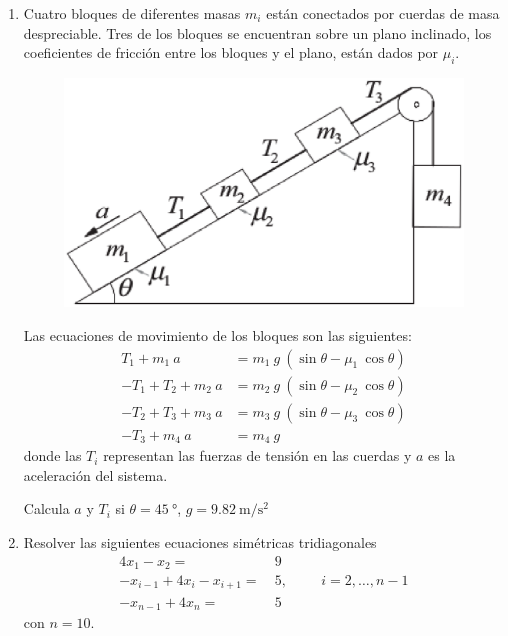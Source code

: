 \begin{enumerate}
\item Cuatro bloques de diferentes masas $m_{i}$ están conectados por cuerdas de masa despreciable. Tres de los bloques se encuentran sobre un plano  inclinado, los coeficientes de fricción entre los bloques y el plano, están dados por $\mu_{i}$.
\begin{figure}[H]
	\centering
	\includegraphics[scale=0.75]{Imagenes/EjercicioMasas.eps}
\end{figure}
Las ecuaciones de movimiento de los bloques son las siguientes:
\begin{align*}
T_{1} + m_{1} \: a &= m_{1} \: g \: (\sin \theta - \mu_{1} \: \cos \theta) \\
-T_{1} + T_{2} + m_{2} \: a &= m_{2} \: g \: (\sin \theta - \mu_{2} \: \cos \theta) \\
-T_{2} + T_{3} + m_{3} \: a &= m_{3} \: g \: (\sin \theta - \mu_{3} \: \cos \theta) \\
-T_{3} + m_{4} \: a &= m_{4} \: g
\end{align*}
donde las $T_{i}$ representan las fuerzas de tensión en las cuerdas y $a$ es la aceleración del sistema.
\par
Calcula $a$ y $T_{i}$ si $\theta=\SI{45}{\degree}$, $g=\SI{9.82}{\meter\per\square\second}$
\item Resolver las siguientes ecuaciones simétricas tridiagonales
\[ \begin{split}
4 x_{1} - x_{2} =& \: 9 \\
-x_{i-1} + 4x_{i} - x_{i+1} =& \: 5, \hspace{1cm} i = 2, \ldots, n-1 \\
-x_{n-1} + 4 x_{n} =& \: 5
\end{split} \]
con $n=10$.

\end{enumerate}
